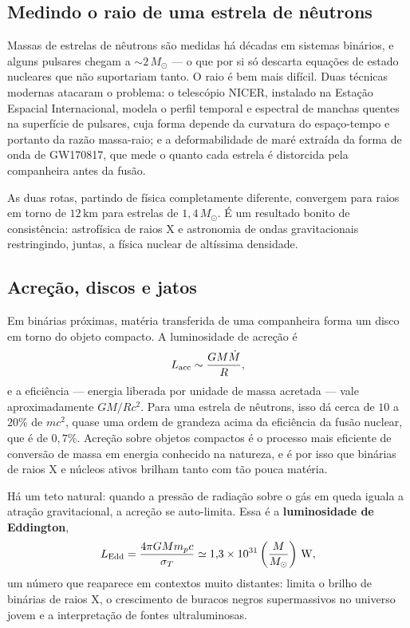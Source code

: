 \documentclass[11pt,a4paper]{article}
\begin{document}
\subsection*{Medindo o raio de uma estrela de nêutrons}

Massas de estrelas de nêutrons são medidas há décadas em sistemas binários, e alguns pulsares chegam a $\sim2\,M_\odot$ --- o que por si só descarta equações de estado nucleares que não suportariam tanto. O raio é bem mais difícil. Duas técnicas modernas atacaram o problema: o telescópio NICER, instalado na Estação Espacial Internacional, modela o perfil temporal e espectral de manchas quentes na superfície de pulsares, cuja forma depende da curvatura do espaço-tempo e portanto da razão massa-raio; e a deformabilidade de maré extraída da forma de onda de GW170817, que mede o quanto cada estrela é distorcida pela companheira antes da fusão.

As duas rotas, partindo de física completamente diferente, convergem para raios em torno de $12\,\mathrm{km}$ para estrelas de $1{,}4\,M_\odot$. É um resultado bonito de consistência: astrofísica de raios X e astronomia de ondas gravitacionais restringindo, juntas, a física nuclear de altíssima densidade.

\subsection*{Acreção, discos e jatos}

Em binárias próximas, matéria transferida de uma companheira forma um disco em torno do objeto compacto. A luminosidade de acreção é
\[
L_{\rm acc}\sim\frac{GM\dot{M}}{R},
\]
e a eficiência --- energia liberada por unidade de massa acretada --- vale aproximadamente $GM/Rc^{2}$. Para uma estrela de nêutrons, isso dá cerca de $10$ a $20\%$ de $mc^{2}$, quase uma ordem de grandeza acima da eficiência da fusão nuclear, que é de $0{,}7\%$. Acreção sobre objetos compactos é o processo mais eficiente de conversão de massa em energia conhecido na natureza, e é por isso que binárias de raios X e núcleos ativos brilham tanto com tão pouca matéria.

Há um teto natural: quando a pressão de radiação sobre o gás em queda iguala a atração gravitacional, a acreção se auto-limita. Essa é a \textbf{luminosidade de Eddington},
\[
L_{\rm Edd}=\frac{4\pi GMm_pc}{\sigma_T}\simeq1{,}3\times10^{31}\left(\frac{M}{M_\odot}\right)\,\mathrm{W},
\]
um número que reaparece em contextos muito distantes: limita o brilho de binárias de raios X, o crescimento de buracos negros supermassivos no universo jovem e a interpretação de fontes ultraluminosas.
\end{document}
